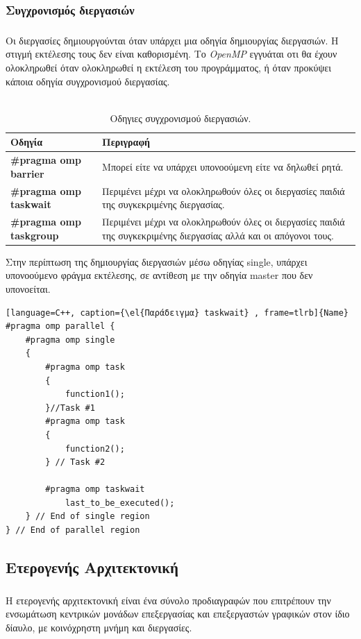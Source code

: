 \documentclass[12pt]{article}
\newcommand{\en}[1]{\foreignlanguage{english}{#1}}
\newcommand{\el}[1]{\selectlanguage{greek}{#1}\selectlanguage{english}}
\begin{document}
\ \\
\subsubsection{Συγχρονισμός διεργασιών}
\subparagraph{}
Οι διεργασίες δημιουργούνται όταν υπάρχει μια οδηγία δημιουργίας διεργασιών. Η στιγμή εκτέλεσης τους δεν είναι καθορισμένη. Το \emph{\en{OpenMP}} εγγυάται οτι θα έχουν ολοκληρωθεί όταν ολοκληρωθεί η εκτέλεση του προγράμματος, ή όταν προκύψει κάποια οδηγία συγχρονισμού διεργασίας.
\ \\
\ \\

\begin{table}[htbp]
\captionsetup{justification=raggedright,
singlelinecheck=false
}
\caption{Οδηγιες συγχρονισμού διεργασιών.}
\def\arraystretch{1.5}
\begin{tabular}{| p{} | p{}|}
\textbf{Οδηγία} \cellcolor[HTML]{D0D0D0} & \textbf{Περιγραφή} \cellcolor[HTML]{D0D0D0} \\
\hline
\textbf{\en{{\#}pragma omp barrier}} & Μπορεί είτε να υπάρχει υπονοούμενη είτε να δηλωθεί ρητά. \\
\hline
\textbf{\en{{\#}pragma omp taskwait}} & Περιμένει μέχρι να ολοκληρωθούν όλες οι διεργασίες παιδιά της συγκεκριμένης διεργασίας.\\
\hline
\textbf{\en{{\#}pragma omp taskgroup}} & Περιμένει μέχρι να ολοκληρωθούν όλες οι διεργασίες παιδιά της συγκεκριμένης διεργασίας αλλά και οι απόγονοι τους.\\
\hline
\end{tabular}
\end{table}

Στην περίπτωση της δημιουργίας διεργασιών μέσω οδηγίας single, υπάρχει υπονοούμενο φράγμα εκτέλεσης, σε αντίθεση με την οδηγία master που δεν υπονοείται.
\clearpage
{}
\begin{lstlisting}[language=C++, caption={\el{Παράδειγμα} taskwait} , frame=tlrb]{Name}
#pragma omp parallel {
	#pragma omp single
	{
		#pragma omp task
		{
			function1();
		}//Task #1
		#pragma omp task
		{
			function2();
		} // Task #2

		#pragma omp taskwait
			last_to_be_executed();
	} // End of single region
} // End of parallel region
\end{lstlisting}
\clearpage
\subsection{Ετερογενής Αρχιτεκτονική}
\subparagraph{}
Η ετερογενής αρχιτεκτονική είναι ένα σύνολο προδιαγραφών που επιτρέπουν την ενσωμάτωση κεντρικών μονάδων επεξεργασίας και επεξεργαστών γραφικών στον ίδιο δίαυλο, με κοινόχρηστη μνήμη και διεργασίες\cite{toms_hardware}.
\end{document}
